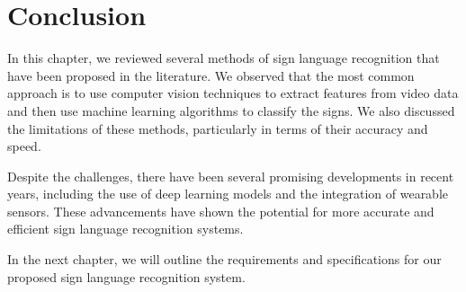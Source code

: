 \section{Conclusion}
In this chapter, we reviewed several methods of sign language recognition that have been proposed in the literature. We observed that the most common approach is to use computer vision techniques to extract features from video data and then use machine learning algorithms to classify the signs. We also discussed the limitations of these methods, particularly in terms of their accuracy and speed.

Despite the challenges, there have been several promising developments in recent years, including the use of deep learning models and the integration of wearable sensors. These advancements have shown the potential for more accurate and efficient sign language recognition systems.

In the next chapter, we will outline the requirements and specifications for our proposed sign language recognition system.